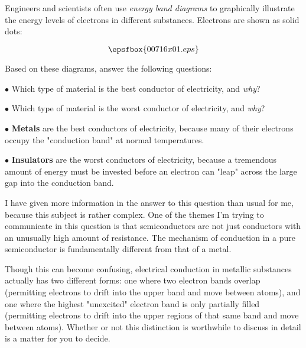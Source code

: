 

Engineers and scientists often use {\it energy band diagrams} to graphically illustrate the energy levels of electrons in different substances.  Electrons are shown as solid dots:

$$\epsfbox{00716x01.eps}$$

Based on these diagrams, answer the following questions:

\medskip
\item{$\bullet$} Which type of material is the best conductor of electricity, and {\it why}?
\item{$\bullet$} Which type of material is the worst conductor of electricity, and {\it why}?
\medskip







\medskip
\item{$\bullet$} {\bf Metals} are the best conductors of electricity, because many of their electrons occupy the "conduction band" at normal temperatures.
\item{$\bullet$} {\bf Insulators} are the worst conductors of electricity, because a tremendous amount of energy must be invested before an electron can "leap" across the large gap into the conduction band.
\medskip







I have given more information in the answer to this question than usual for me, because this subject is rather complex.  One of the themes I'm trying to communicate in this question is that semiconductors are not just conductors with an unusually high amount of resistance.  The mechanism of conduction in a pure semiconductor is fundamentally different from that of a metal.

Though this can become confusing, electrical conduction in metallic substances actually has two different forms: one where two electron bands overlap (permitting electrons to drift into the upper band and move between atoms), and one where the highest "unexcited" electron band is only partially filled (permitting electrons to drift into the upper regions of that same band and move between atoms).  Whether or not this distinction is worthwhile to discuss in detail is a matter for you to decide.




